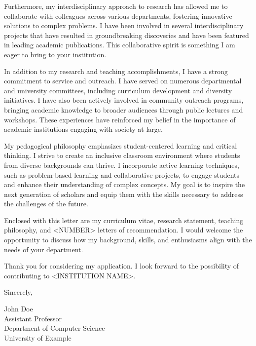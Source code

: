 \documentclass[
    language=english,
    doctype=cover-letter,
    institution=none,
    titlestyle=simple
]{../../omnilatex}
\begin{document}
Furthermore, my interdisciplinary approach to research has allowed me to collaborate with colleagues across various departments, fostering innovative solutions to complex problems. I have been involved in several interdisciplinary projects that have resulted in groundbreaking discoveries and have been featured in leading academic publications. This collaborative spirit is something I am eager to bring to your institution.

In addition to my research and teaching accomplishments, I have a strong commitment to service and outreach. I have served on numerous departmental and university committees, including curriculum development and diversity initiatives. I have also been actively involved in community outreach programs, bringing academic knowledge to broader audiences through public lectures and workshops. These experiences have reinforced my belief in the importance of academic institutions engaging with society at large.

My pedagogical philosophy emphasizes student-centered learning and critical thinking. I strive to create an inclusive classroom environment where students from diverse backgrounds can thrive. I incorporate active learning techniques, such as problem-based learning and collaborative projects, to engage students and enhance their understanding of complex concepts. My goal is to inspire the next generation of scholars and equip them with the skills necessary to address the challenges of the future.

Enclosed with this letter are my curriculum vitae, research statement, teaching philosophy, and <NUMBER> letters of recommendation. I would welcome the opportunity to discuss how my background, skills, and enthusiasms align with the needs of your department.

Thank you for considering my application. I look forward to the possibility of contributing to <INSTITUTION NAME>.

Sincerely,

\vspace{2cm}

John Doe\\
Assistant Professor\\
Department of Computer Science\\
University of Example
\end{document}
